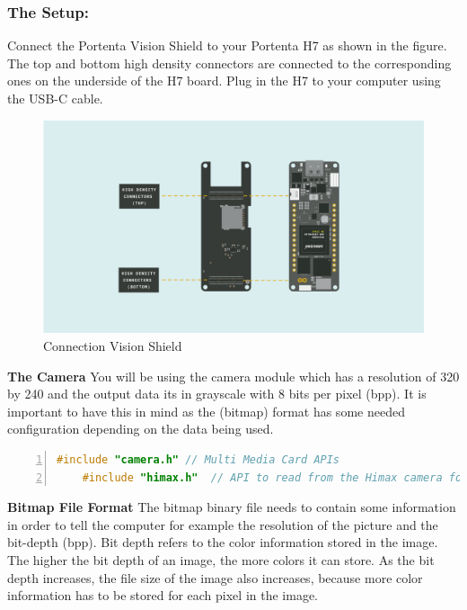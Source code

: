 \subsubsection{The Setup:} Connect the Portenta Vision Shield to your Portenta H7 as shown in the figure. The top and bottom high density connectors are connected to the corresponding ones on the underside of the H7 board. Plug in the H7 to your computer using the USB-C cable. \cite{portentaCameraToBitmap:2024}

\begin{figure}
	\begin{center}
		\includegraphics[width=0.7\linewidth]{Images/VisionShield/Connection VS.png}
		\caption{Connection Vision Shield}
		\label{Connection VS}
	\end{center}
\end{figure}

\textbf{The Camera}
\newline
You will be using the  camera module which has a resolution of 320 by 240 and the output data its in grayscale with 8 bits per pixel (bpp). It is important to have this in mind as the  (bitmap) format has some needed configuration depending on the data being used. \cite{portentaCameraToBitmap:2024}
\newline


\begin{lstlisting}[language=C++, frame=single, numbers=left, basicstyle=\ttfamily\small]
	#include "camera.h" // Multi Media Card APIs
	#include "himax.h"  // API to read from the Himax camera found on the Portenta Vision Shield
\end{lstlisting}

\textbf{Bitmap File Format}\newline
The bitmap binary file needs to contain some information in order to tell the computer for example the resolution of the picture and the bit-depth (bpp). Bit depth refers to the color information stored in the image. The higher the bit depth of an image, the more colors it can store. As the bit depth increases, the file size of the image also increases, because more color information has to be stored for each pixel in the image.

